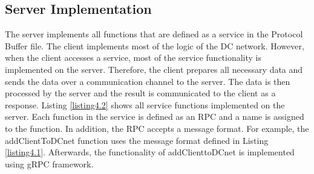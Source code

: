 \subsection{Server Implementation}
The server implements all functions that are defined as a service in the Protocol Buffer file. The client implements most of the logic of the DC network. However, when the client accesses a service, most of the service functionality is implemented on the server. Therefore, the client prepares all necessary data and sends the data over a communication channel to the server. The data is then processed by the server and the result is communicated to the client as a response. Listing \ref{listing4.2} shows all service functions implemented on the server. %
Each function in the service is defined as an RPC and a name is assigned to the function. In addition, the RPC accepts a message format. For example, the addClientToDCnet function uses the message format defined in Listing \ref{listing4.1}. Afterwards, the functionality of addClienttoDCnet is implemented using gRPC framework.
\\

\\ %
